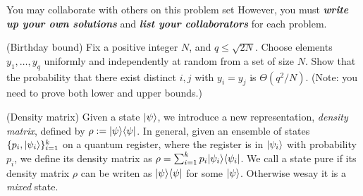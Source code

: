 \medskip

\noindent You may collaborate with others on this problem set
However, you must \textbf{\emph{write up your own solutions}} and
\textbf{\emph{list your collaborators}} for each problem.

\begin{questions}
\question[10] (Birthday bound) Fix a positive integer $N$, and
  $q\leq \sqrt{2N}$. Choose elements $y_1, \ldots, y_q$ uniformly and
  independently at random from a set of size $N$. Show that the
  probability that there exist distinct $i, j$ with $y_i = y_j$ is
  $\Theta(q^2/N)$. (Note: you need to prove both lower and upper bounds.)

\question (Density matrix) Given a state $\lvert \psi \rangle$, we
  introduce a new representation, \emph{density matrix}, defined by
  $\rho := \lvert \psi \rangle\langle \psi \rvert$. In general, given an ensemble of
  states $\{p_i, \lvert \psi_i \rangle\}_{i=1}^k$ on a quantum register, where
  the register is in $\lvert \psi_i \rangle$ with probability $p_i$, we define
  its density matrix as
  $\rho = \sum_{i =1}^k p_i\lvert \psi_i \rangle\langle \psi_i \rvert$. We call a state
  pure if its density matrix $\rho$ can be writen as
  $\lvert \psi \rangle\langle \psi \rvert$ for some $\lvert \psi \rangle$. Otherwise wesay it is
  a \emph{mixed} state.
  
  

\end{questions}
